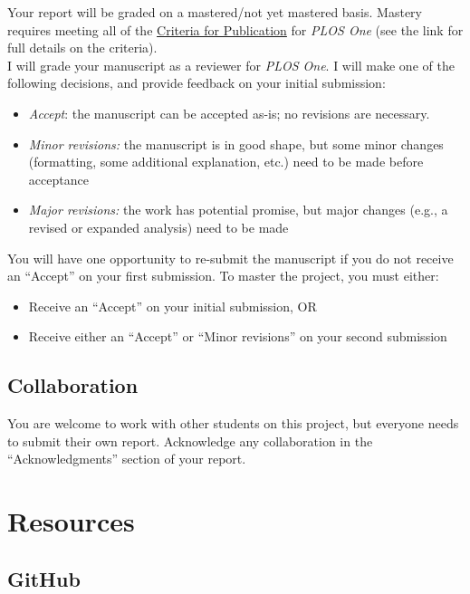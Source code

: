 \documentclass[11pt]{article}
\begin{document}
Your report will be graded on a mastered/not yet mastered basis. Mastery requires meeting all of the \href{https://journals.plos.org/plosone/s/journal-information#loc-criteria-for-publication}{Criteria for Publication} for \textit{PLOS One} (see the link for full details on the criteria).\\

\noindent I will grade your manuscript as a reviewer for \textit{PLOS One}. I will make one of the following decisions, and provide feedback on your initial submission:
\begin{itemize}
\item \textit{Accept}: the manuscript can be accepted as-is; no revisions are necessary.

\item \textit{Minor revisions:} the manuscript is in good shape, but some minor changes (formatting, some additional explanation, etc.) need to be made before acceptance

\item \textit{Major revisions:} the work has potential promise, but major changes (e.g., a revised or expanded analysis) need to be made
\end{itemize}

\noindent You will have one opportunity to re-submit the manuscript if you do not receive an ``Accept'' on your first submission. To master the project, you must either:
\begin{itemize}
\item Receive an ``Accept'' on your initial submission, OR
\item Receive either an ``Accept'' or ``Minor revisions'' on your second submission
\end{itemize}

\subsection*{Collaboration}

You are welcome to work with other students on this project, but everyone needs to submit their own report. Acknowledge any collaboration in the ``Acknowledgments'' section of your report.

\section*{Resources}

\subsection*{GitHub}
\end{document}
